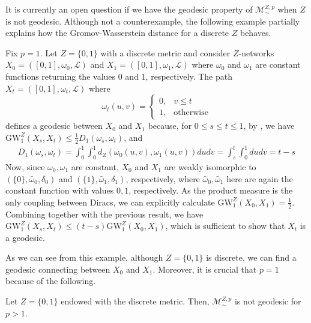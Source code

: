 \documentclass[twoside,11pt]{article}
\theoremstyle{definition}
\newcommand{\M}{\mathcal{M}}
\newcommand{\MZp}{\M_{\sim}^{Z,p}}
\begin{document}
It is currently an open question if we have the geodesic property of $\MZp$ when $Z$ is not geodesic. Although not a counterexample, the following example partially explains how the Gromov-Wasserstein distance for a discrete $Z$ behaves.
\begin{example}
    Fix $p=1$. Let $Z=\{0,1\}$ with a discrete metric and consider $Z$-networks $X_0=([0,1],\omega_0,\mathscr{L})$ and $X_1= ([0,1],\omega_1,\mathscr{L})$ where $\omega_0$ and $\omega_1$ are constant functions returning the values $0$ and $1$, respectively. The path $X_t = ([0,1],\omega_t,\mathscr{L})$ where 
    \begin{equation}
        \omega_{t}(u,v) = \begin{cases}
            0, & v\leq t \\ 1, & \textrm{otherwise}
        \end{cases}
    \end{equation}
    defines a geodesic between $X_0$ and $X_1$ because, for $0\leq s\leq t\leq 1$, by , we have $\mathrm{GW}_1^Z(X_s,X_t) \leq \frac{1}{2} D_1(\omega_s,\omega_t)$, and
    \begin{align}
        D_1(\omega_s,\omega_t) =\int_{0}^{1}\int_{0}^{1}d_Z(\omega_0(u,v),\omega_1(u,v))dudv =\int_{s}^{t}\int_{0}^{1}dudv = t-s
    \end{align}
    Now, since $\omega_0,\omega_1$ are constant, $X_0$ and $X_1$ are weakly isomorphic to $(\{0\},\bar{\omega}_0,\delta_{0})$ and $(\{1\},\bar{\omega}_1,\delta_{1})$, respectively, where $\bar{\omega}_0,\bar{\omega}_1$ here are again the constant function with values $0,1$, respectively. As the product measure is the only coupling between Diracs, we can explicitly calculate $\mathrm{GW}_1^Z(X_0, X_1)=\frac{1}{2}$. Combining together with the previous result, we have $\mathrm{GW}_1^Z(X_s,X_t)\leq (t-s)\mathrm{GW}_1^Z(X_0,X_1)$, which is sufficient to show that $X_t$ is a geodesic.
\end{example}
As we can see from this example, although $Z=\{0,1\}$ is discrete, we can find a geodesic connecting between $X_0$ and $X_1$. Moreover, it is crucial that $p=1$ because of the following.
\begin{proposition}
Let $Z=\{0,1\}$ endowed with the discrete metric. Then, $\MZp$ is not geodesic for $p>1$.   
\end{proposition}
\end{document}
